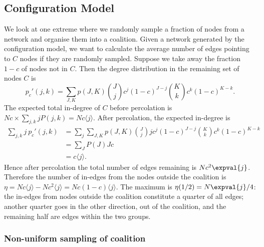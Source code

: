 

\subsection{Configuration Model}
We look at one extreme where we randomly sample a fraction of nodes from a network and organise them into a coalition. Given a network generated by the configuration model, we want to calculate the average number of edges pointing to $C$ nodes if they are randomly sampled. Suppose we take away the fraction $1-c$ of nodes not in $C$. Then the degree distribution in the remaining set of nodes $C$ is
\begin{equation}
p_c'(j,k) = \sum_{J, K} p(J,K) {J \choose j} c^j(1-c)^{J-j} {K \choose k} c^k(1-c)^{K-k}.
\end{equation}
The expected total in-degree of $C$ before percolation is $Nc \times \sum_{j,k} j P(j,k) = Nc\langle j \rangle$. After percolation, the expected in-degree is
\begin{align}
\sum_{j,k} j\ p_c'(j,k) &= \sum_j \sum_{J, K} p(J,K) {J \choose j} j c^j(1-c)^{J-j} {K \choose k} c^k(1-c)^{K-k} \\
&= \sum_{J} P(J) Jc \\
&= c\langle j\rangle.
\end{align}
Hence after percolation the total number of edges remaining is $Nc^2\expval{j}$. Therefore the number of in-edges from the nodes outside the coalition is $\eta = Nc\langle j \rangle - Nc^2\langle j \rangle = Nc(1-c) \langle j \rangle$. The maximum is $\eta (1/2) = N\expval{j}/4$: the in-edges from nodes outside the coalition constitute a quarter of all edges; another quarter goes in the other direction, out of the coalition, and the remaining half are edges within the two groups.

\subsubsection{Non-uniform sampling of coalition}

